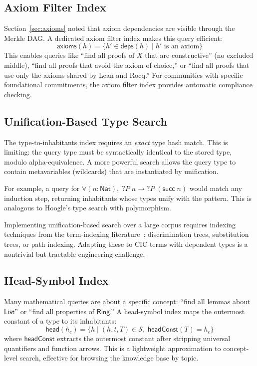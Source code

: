 \documentclass[11pt]{article}
\theoremstyle{definition}
\theoremstyle{plain}
\theoremstyle{remark}
\newcommand{\hashset}{\mathcal{S}}
\newcommand{\Nat}{\textsf{Nat}}
\begin{document}
\subsection{Axiom Filter Index}
\label{sec:axiom-index}

Section~\ref{sec:axioms} noted that axiom dependencies are visible through the Merkle DAG.
A dedicated axiom filter index makes this query efficient:
\[
  \textsf{axioms}(h) = \{ h' \in \textsf{deps}(h) \mid h' \text{ is an axiom} \}
\]
This enables queries like ``find all proofs of $X$ that are constructive'' (no excluded middle),
``find all proofs that avoid the axiom of choice,'' or ``find all proofs
that use only the axioms shared by Lean and Rocq.''
For communities with specific foundational commitments, the axiom filter index
provides automatic compliance checking.

\subsection{Unification-Based Type Search}
\label{sec:unification-index}

The type-to-inhabitants index requires an \emph{exact} type hash match.
This is limiting: the query type must be syntactically identical to the stored type,
modulo alpha-equivalence.
A more powerful search allows the query type to contain metavariables
(wildcards) that are instantiated by unification.

For example, a query for $\forall (n : \Nat),\; ?P\;n \to ?P\;(\textsf{succ}\;n)$
would match any induction step, returning inhabitants whose types unify with the pattern.
This is analogous to Hoogle's type search with polymorphism.

Implementing unification-based search over a large corpus requires indexing techniques
from the term-indexing literature~\cite{graf1996}: discrimination trees, substitution trees,
or path indexing.
Adapting these to CIC terms with dependent types is a nontrivial but tractable
engineering challenge.

\subsection{Head-Symbol Index}
\label{sec:head-index}

Many mathematical queries are about a specific concept: ``find all lemmas about $\textsf{List}$''
or ``find all properties of $\textsf{Ring}$.''
A head-symbol index maps the outermost constant of a type to its inhabitants:
\[
  \textsf{head}(h_c) = \{ h \mid (h, t, T) \in \hashset,\; \textsf{headConst}(T) = h_c \}
\]
where $\textsf{headConst}$ extracts the outermost constant after stripping universal
quantifiers and function arrows.
This is a lightweight approximation to concept-level search, effective for browsing
the knowledge base by topic.
\end{document}
